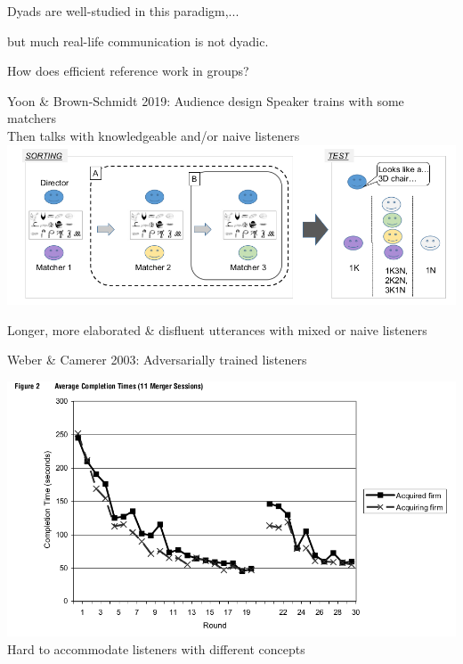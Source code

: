 \documentclass[ 12pt, xcolor=beamer,table,usenames,dvipsnames, ignorenonframetext, ngerman]{beamer}
\begin{document}
\begin{frame}{}
	\begin{large}
 Dyads are well-studied in this paradigm,...
 \pause
 
  but much real-life communication is not dyadic.

\bigskip

\pause

 How does efficient reference work in groups?
\end{large}
\end{frame}

\begin{frame}{\large Yoon \& Brown-Schmidt 2019: Audience design}
	Speaker trains with some matchers\\
	Then talks with knowledgeable and/or naive listeners
	\medskip
	\includegraphics[width=\textwidth]{../images/yoon_diagram.png}
	
	Longer, more elaborated \& disfluent utterances with mixed or naive listeners
\end{frame}

\begin{frame}{\large Weber \& Camerer 2003: Adversarially trained listeners}
	
	\includegraphics[width=\textwidth]{../images/weber.png}
	Hard to accommodate listeners with different concepts
\end{frame}
\end{document}
